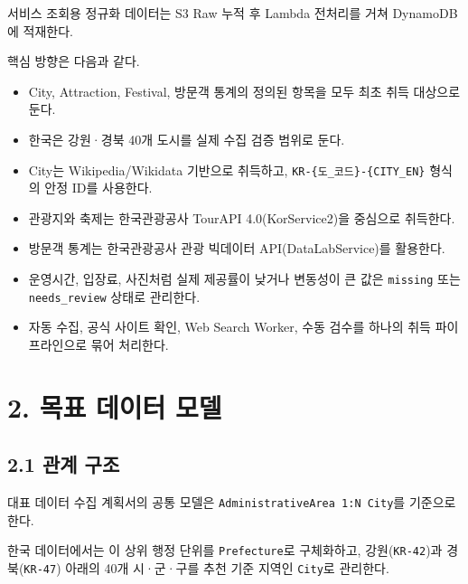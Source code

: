 \documentclass[12pt,a4paper]{article}
\newcommand{\DocNeedspace}[1]{\par\ifdim\dimexpr\pagegoal-\pagetotal\relax<#1\newpage\fi}
\begin{document}
\DocNeedspace{3\baselineskip}
서비스 조회용 정규화 데이터는 S3 Raw 누적 후 Lambda 전처리를 거쳐 DynamoDB에 적재한다.


\DocNeedspace{3\baselineskip}
핵심 방향은 다음과 같다.


\begin{itemize}
\item City, Attraction, Festival, 방문객 통계의 정의된 항목을 모두 최초 취득 대상으로 둔다.
\item 한국은 강원·경북 40개 도시를 실제 수집 검증 범위로 둔다.
\item City는 Wikipedia/Wikidata 기반으로 취득하고, \texttt{KR-\allowbreak{}\{\allowbreak{}도\_\allowbreak{}코드\allowbreak{}\}-\allowbreak{}\{\allowbreak{}CITY\_\allowbreak{}EN\allowbreak{}\}} 형식의 안정 ID를 사용한다.
\item 관광지와 축제는 한국관광공사 TourAPI 4.0(KorService2)을 중심으로 취득한다.
\item 방문객 통계는 한국관광공사 관광 빅데이터 API(DataLabService)를 활용한다.
\item 운영시간, 입장료, 사진처럼 실제 제공률이 낮거나 변동성이 큰 값은 \texttt{missing} 또는 \texttt{needs\_\allowbreak{}review} 상태로 관리한다.
\item 자동 수집, 공식 사이트 확인, Web Search Worker, 수동 검수를 하나의 취득 파이프라인으로 묶어 처리한다.
\end{itemize}


\newpage

\DocNeedspace{10\baselineskip}
\section*{2. 목표 데이터 모델}


\DocNeedspace{8\baselineskip}
\subsection*{2.1 관계 구조}


\DocNeedspace{3\baselineskip}
대표 데이터 수집 계획서의 공통 모델은 \texttt{Administrative\allowbreak{}Area 1:\allowbreak{}N City}를 기준으로 한다.

\DocNeedspace{3\baselineskip}
한국 데이터에서는 이 상위 행정 단위를 \texttt{Prefecture}로 구체화하고, 강원(\texttt{KR-\allowbreak{}42})과 경북(\texttt{KR-\allowbreak{}47}) 아래의 40개 시·군·구를 추천 기준 지역인 \texttt{City}로 관리한다.
\end{document}

